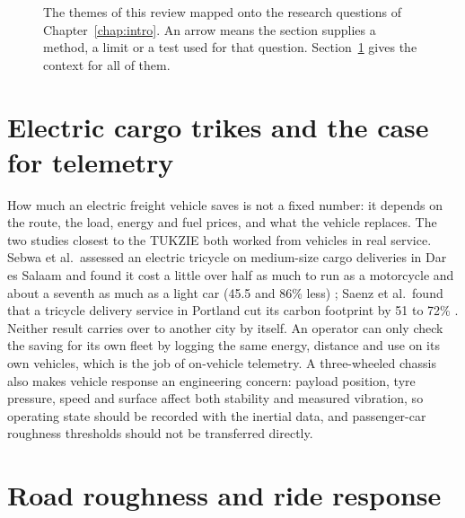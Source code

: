 \begin{figure}[htbp]
\centering

\caption[The themes of this review mapped onto the research questions of Chapter~\ref{chap:intro}]{The themes of this review mapped onto the research questions of Chapter~\ref{chap:intro}. An arrow means the section supplies a method, a limit or a test used for that question. Section~\ref{sec:lit-trikes} gives the context for all of them.}
\label{fig:lit-map}
\end{figure}

\section{Electric cargo trikes and the case for telemetry}
\label{sec:lit-trikes}

How much an electric freight vehicle saves is not a fixed number: it depends on the route, the load, energy and fuel prices, and what the vehicle replaces. The two studies closest to the TUKZIE both worked from vehicles in real service. Sebwa et al.\ assessed an electric tricycle on medium-size cargo deliveries in Dar es Salaam and found it cost a little over half as much to run as a motorcycle and about a seventh as much as a light car (45.5 and 86\% less) \cite{sebwa2025}; Saenz et al.\ found that a tricycle delivery service in Portland cut its carbon footprint by 51 to 72\% \cite{saenz2016}. Neither result carries over to another city by itself. An operator can only check the saving for its own fleet by logging the same energy, distance and use on its own vehicles, which is the job of on-vehicle telemetry. A three-wheeled chassis also makes vehicle response an engineering concern: payload position, tyre pressure, speed and surface affect both stability and measured vibration, so operating state should be recorded with the inertial data, and passenger-car roughness thresholds should not be transferred directly.

\section{Road roughness and ride response}
\label{sec:lit-roughness}

